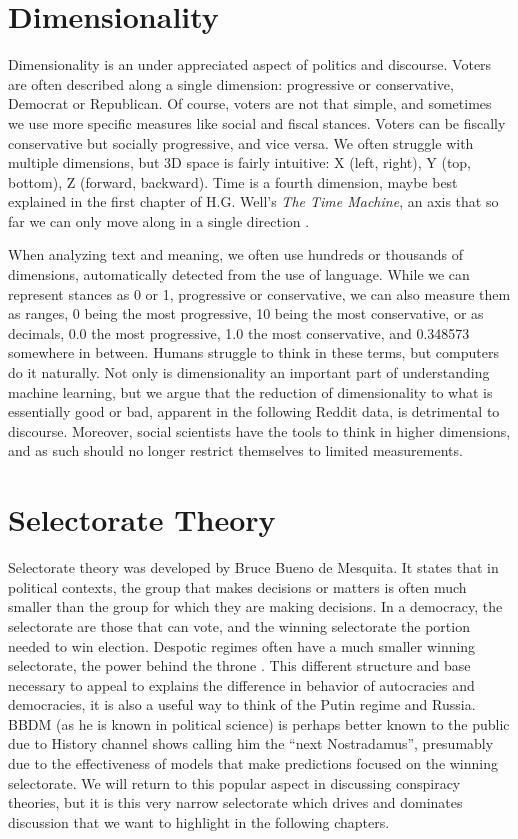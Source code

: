\documentclass[doublespacing]{utdthesis}
\let\cite=\citep
\begin{document}
\section{Dimensionality}

Dimensionality is an under appreciated aspect of politics and discourse.
Voters are often described along a single dimension: progressive or conservative, Democrat or Republican.
Of course, voters are not that simple, and sometimes we use more specific measures like social and fiscal stances.
Voters can be fiscally conservative but socially progressive, and vice versa.
We often struggle with multiple dimensions, but 3D space is fairly intuitive: X (left, right), Y (top, bottom), Z (forward, backward).
Time is a fourth dimension, maybe best explained in the first chapter of H.G. Well's \emph{The Time Machine}, an axis that so far we can only move along in a single direction \cite{wells}.

When analyzing text and meaning, we often use hundreds or thousands of dimensions, automatically detected from the use of language.
While we can represent stances as 0 or 1, progressive or conservative, we can also measure them as ranges, 0 being the most progressive, 10 being the most conservative, or as decimals, 0.0 the most progressive, 1.0 the most conservative, and 0.348573 somewhere in between.
Humans struggle to think in these terms, but computers do it naturally.
Not only is dimensionality an important part of understanding machine learning, but we argue that the reduction of dimensionality to what is essentially good or bad, apparent in the following Reddit data, is detrimental to discourse.
Moreover, social scientists have the tools to think in higher dimensions, and as such should no longer restrict themselves to limited measurements.

\section{Selectorate Theory}

Selectorate theory was developed by Bruce Bueno de Mesquita.
It states that in political contexts, the group that makes decisions or matters is often much smaller than the group for which they are making decisions.
In a democracy, the selectorate are those that can vote, and the winning selectorate the portion needed to win election.
Despotic regimes often have a much smaller winning selectorate, the power behind the throne \cite{de2005}.
This different structure and base necessary to appeal to explains the difference in behavior of autocracies and democracies, it is also a useful way to think of the Putin regime and Russia.
BBDM (as he is known in political science) is perhaps better known to the public due to History channel shows calling him the ``next Nostradamus'', presumably due to the effectiveness of models that make predictions focused on the winning selectorate.
We will return to this popular aspect in discussing conspiracy theories, but it is this very narrow selectorate which drives and dominates discussion that we want to highlight in the following chapters.
\end{document}
